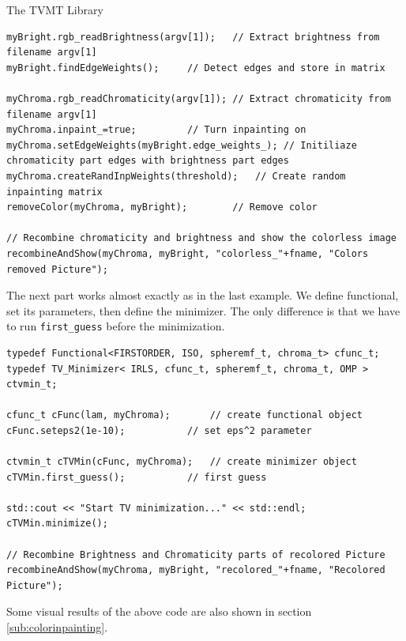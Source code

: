 \begin{chapter}{The TVMT Library}
\cppinline
\begin{lstlisting}[label=code:tut2_edgeandcolorremoval,caption={Color and brightness input, edge detection and color removal}]
myBright.rgb_readBrightness(argv[1]);	// Extract brightness from filename argv[1]
myBright.findEdgeWeights();		// Detect edges and store in matrix

myChroma.rgb_readChromaticity(argv[1]); // Extract chromaticity from filename argv[1]
myChroma.inpaint_=true;			// Turn inpainting on
myChroma.setEdgeWeights(myBright.edge_weights_); // Initiliaze chromaticity part edges with brightness part edges
myChroma.createRandInpWeights(threshold);   // Create random inpainting matrix
removeColor(myChroma, myBright);	    // Remove color

// Recombine chromaticity and brightness and show the colorless image
recombineAndShow(myChroma, myBright, "colorless_"+fname, "Colors removed Picture");
\end{lstlisting}

The next part works almost exactly as in the last example. We define functional, set its parameters, then define the minimizer. The only difference is that
we have to run \texttt{first\_guess} before the minimization.\\

\cppinline
\begin{lstlisting}[label=code:tut2_functionalmin,caption={Functional and minimizer definition, first guess and minimization}]
typedef Functional<FIRSTORDER, ISO, spheremf_t, chroma_t> cfunc_t;
typedef TV_Minimizer< IRLS, cfunc_t, spheremf_t, chroma_t, OMP > ctvmin_t;

cfunc_t cFunc(lam, myChroma);	    // create functional object
cFunc.seteps2(1e-10);		    // set eps^2 parameter

ctvmin_t cTVMin(cFunc, myChroma);   // create minimizer object
cTVMin.first_guess();		    // first guess

std::cout << "Start TV minimization..." << std::endl;
cTVMin.minimize();		    

// Recombine Brightness and Chromaticity parts of recolored Picture
recombineAndShow(myChroma, myBright, "recolored_"+fname, "Recolored Picture");
\end{lstlisting}

Some visual results of the above code are also shown in section \ref{sub:colorinpainting}.





\end{chapter}
